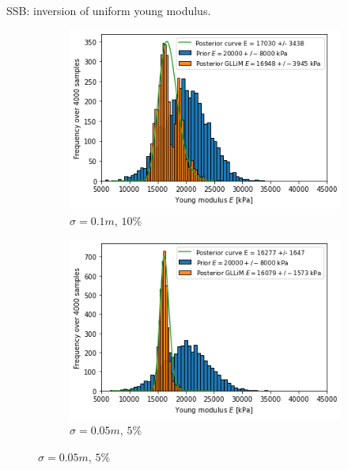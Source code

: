 	\begin{frame}{SSB: inversion of uniform young modulus.}
	\begin{figure}
	\begin{subfigure}{0.40\textwidth}
	\includegraphics[width=\textwidth]{graphs/E_single/bayes_inversion_disc=0.1.png}
	\caption{$\sigma = 0.1 \si{m}$, $10\%$}
	\end{subfigure}
	\begin{subfigure}{0.40\textwidth}
	\includegraphics[width=\textwidth]{graphs/E_single/bayes_inversion_disc=0.05.png}
	\caption{$\sigma = 0.05 \si{m}$, $5\%$}
	\end{subfigure}
	

\end{figure}
\end{frame}
